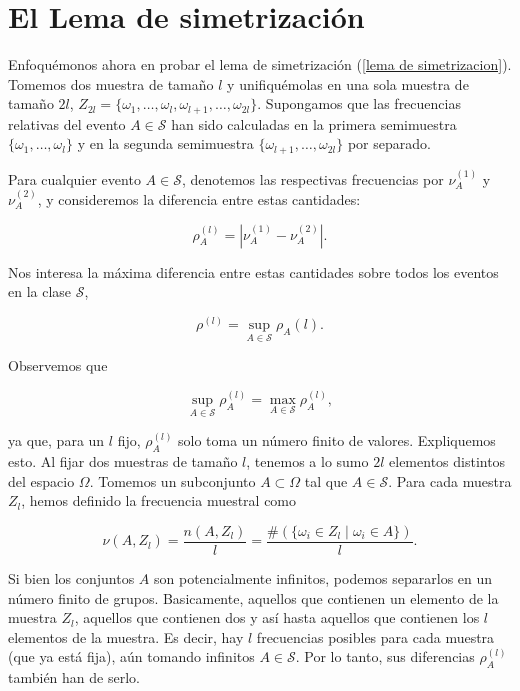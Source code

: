 \documentclass{report}
\begin{document}
\bigskip

\section{El Lema de simetrización}

Enfoquémonos ahora en probar el lema de simetrización (\ref{lema de simetrizacion}). Tomemos dos muestra de tamaño $l$ y
unifiquémolas en una sola muestra de tamaño \( 2l \),
\( Z_{2l} = \{ \omega_1, \dots, \omega_l, \omega_{l+1}, \dots, \omega_{2l} \} \). Supongamos que las frecuencias relativas del evento \( A \in \mathcal{S} \) 
han sido calculadas en la primera semimuestra \( \{ \omega_1, \dots, \omega_l \} \) y en la segunda semimuestra \( \{ \omega_{l+1}, \dots, \omega_{2l} \} \)
por separado.\newline

Para cualquier evento $A\in\mathcal{S}$, denotemos las respectivas frecuencias por \( \nu_A^{(1)}\) y \( \nu_A^{(2)} \), 
y consideremos la diferencia entre estas cantidades:

\[
\rho^{(l)}_A = |\nu_A^{(1)} - \nu_A^{(2)}|.
\]

Nos interesa la máxima diferencia entre estas cantidades sobre todos los eventos en la clase \( \mathcal{S} \),

\[
\rho^{(l)} = \sup_{A \in \mathcal{S}} \rho_A(l).
\]

Observemos que 

\[
\sup_{A \in \mathcal{S}} \rho_A^{(l)} = \max_{A \in \mathcal{S}} \rho_A^{(l)},
\]

ya que, para un \( l \) fijo, \( \rho_A^{(l)} \) solo toma un número finito de valores. Expliquemos esto.
Al fijar dos muestras de tamaño $l$, tenemos a lo sumo $2l$ elementos distintos del espacio $\Omega$. Tomemos un
subconjunto $A\subset \Omega$ tal que $A\in\mathcal{S}$. Para cada muestra $Z_l$, hemos definido la frecuencia muestral
como 

\[
\nu(A,Z_l) = \frac{n(A,Z_l)}{l} = \frac{\#(\{ \omega_i \in Z_l \mid \omega_i \in A \})}{l}.
\]

Si bien los conjuntos $A$ son potencialmente infinitos, podemos separarlos en un número finito de grupos. Basicamente,
aquellos que contienen un elemento de la muestra $Z_l$, aquellos que contienen dos y así hasta aquellos que contienen
los $l$ elementos de la muestra. Es decir, hay $l$ frecuencias posibles para cada muestra (que ya está fija), aún
tomando infinitos $A\in\mathcal{S}$. Por lo tanto, sus diferencias $\rho_A^{(l)}$ también han de serlo.\newline
\end{document}
